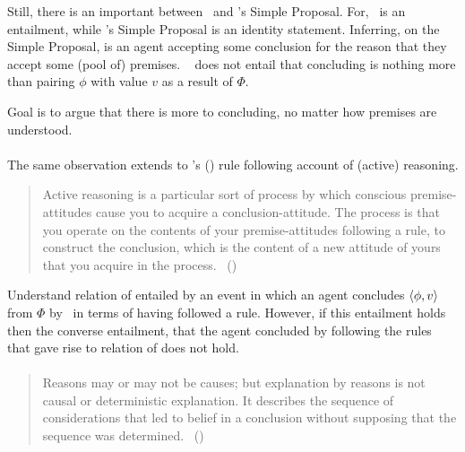 \begin{note}
  Still, there is an important between~\supportI{} and \citeauthor{Wright:2014tt}'s Simple Proposal.
  For,~\supportI{} is an entailment, while \citeauthor{Wright:2014tt}'s Simple Proposal is an identity statement.
  Inferring, on the Simple Proposal, is an agent accepting some conclusion for the reason that they accept some (pool of) premises.
 ~\supportI{} does not entail that concluding is nothing more than pairing \(\phi\) with value \(v\) as a result of \(\Phi\).

  Goal is to argue that there is more to concluding, no matter how premises are understood.
\end{note}

\paragraph{\textcite{Broome:2002aa}}

\begin{note}
  The same observation extends to \citeauthor{Broome:2002aa}'s (\citeyear{Broome:2013aa}) rule following account of (active) reasoning.

  \begin{quote}
    Active reasoning is a particular sort of process by which conscious premise-attitudes cause you to acquire a conclusion-attitude.
    The process is that you operate on the contents of your premise-attitudes following a rule, to construct the conclusion, which is the content of a new attitude of yours that you acquire in the process.\newline
    \mbox{ }\hfill\mbox{(\citeyear[234]{Broome:2002aa})}
  \end{quote}

  Understand relation of \support{} entailed by an event in which an agent concludes \(\langle \phi, v \rangle\) from \(\Phi\) by~\supportI{} in terms of having followed a rule.
  However, if this entailment holds then the converse entailment, that the agent concluded by following the rules that gave rise to relation of \support{} does not hold.
\end{note}

\paragraph{\textcite{Harman:1973ww}}

\begin{quote}
  Reasons may or may not be causes; but explanation by reasons is not causal or deterministic explanation.
  It describes the sequence of considerations that led to belief in a conclusion without supposing that the sequence was determined.%
  \mbox{ }\hfill\mbox{(\citeyear[52]{Harman:1973ww})}
\end{quote}

